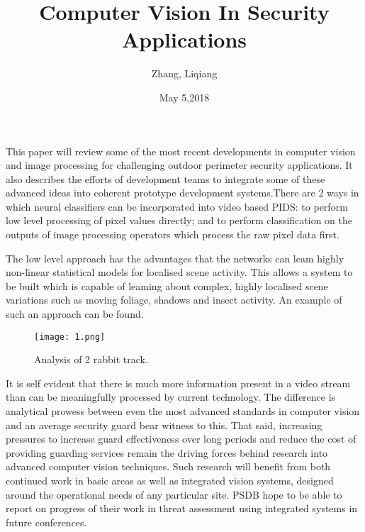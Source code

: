 \documentclass{article}
\author{Zhang, Liqiang}
\date{May 5,2018}
\title{Computer Vision In Security Applications}
\begin{document}
\maketitle
\par
This paper will review some of the most recent developments in computer vision and image processing for challenging outdoor perimeter security applications. It also describes the efforts of development teams to integrate some of these advanced ideas into coherent prototype development systems.There are 2 ways in which neural classifiers can be incorporated into video based PIDS: to perform low level processing of pixel values directly; and to perform classification on the outputs of image processing operators which process the raw pixel data first.\cite{Freer1996Automatic}
\par
The low level approach has the advantages that the networks can leam highly non-linear statistical models for localised scene activity. This allows a system to be built which is capable of
leaming about complex, highly localised scene variations such as moving foliage, shadows and insect activity. An example of such an approach can be found.
\begin{figure}[H]
  \centering
  \texttt{[image: 1.png]}\\
  \caption{Analysis of 2 rabbit track.}\label{}
\end{figure}
It is self evident that there is much more information present in a video stream than can be meaningfully processed by current technology. The difference is analytical prowess between even the most advanced standards in computer vision and an average security guard bear witness to this. That said, increasing pressures to increase guard effectiveness over long periods and reduce the cost of providing guarding services remain the driving forces behind research into advanced computer vision techniques. Such research will benefit from both continued work in basic areas as well as integrated vision systems, designed around the operational needs of any particular site. PSDB hope to be able to report on progress of their work in threat assessment using integrated systems in future conferences.
\par


\end{document}
